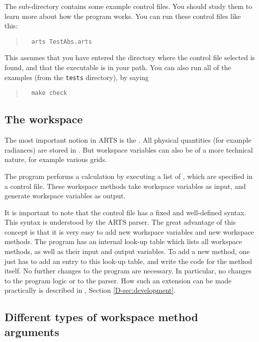 The sub-directory  contains some example control files.
You should study them to learn more about how the program works. You
can run these control files like this:
\begin{quote}
\begin{verbatim}
  arts TestAbs.arts
\end{verbatim}
\end{quote}
This assumes that you have entered the directory where the control
file selected is found, and that the  executable is in
your path. You can also run all of the examples (from the \verb|tests|
directory), by saying
\begin{quote}
\begin{verbatim}
  make check
\end{verbatim}
\end{quote}


\subsection{The workspace}

The most important notion in ARTS is the . All
physical quantities (for example radiances) are stored in
. But workspace variables can also be
of a more technical nature, for example various grids.

The program performs a calculation by executing a list of
, which are specified in a control file.
These workspace methods take workspace variables as input, and
generate workspace variables as output.

It is important to note that the control file has a fixed and
well-defined syntax. This syntax is understood by the ARTS parser.
The great advantage of this concept is that it is very easy to add new
workspace variables and new workspace methods. The program has an
internal look-up table which lists all workspace methods, as well as
their input and output variables. To add a new method, one just has to
add an entry to this look-up table, and write the code for the method
itself. No further changes to the program are necessary. In
particular, no changes to the program logic or to the parser. How such
an extension can be made practically is described in \developer, Section
\ref{D-sec:development}.



\subsection{Different types of workspace method arguments}

